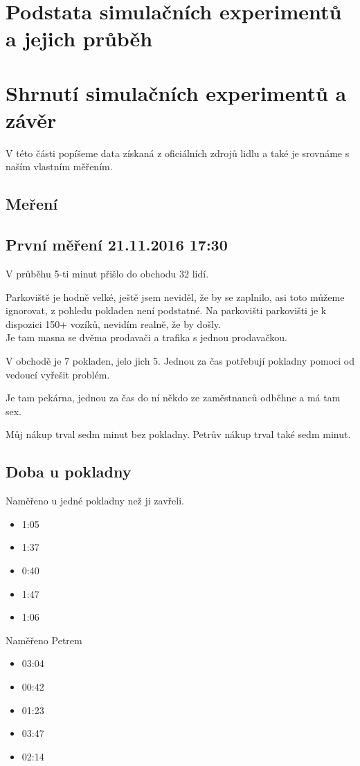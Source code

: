 \documentclass[12pt,a4paper,titlepage]{article}
\begin{document}
\section{Podstata simulačních experimentů a jejich průběh}
\section{Shrnutí simulačních experimentů a závěr}

V této části popíšeme data získaná z oficiálních zdrojů lidlu a také je srovnáme s naším vlastním měřením.
\subsection{Meření}
\subsection{První měření 21.11.2016 17:30}
V průběhu 5-ti minut přišlo do obchodu 32 lidí.

Parkoviště je hodně velké, ještě jsem neviděl, že by se zaplnilo, asi toto můžeme ignorovat, z pohledu pokladen není podstatné.
Na parkovišti parkovišti je k dispozici 150+ vozíků, nevidím realně, že by došly.
\\
Je tam masna se dvěma prodavači a trafika s jednou prodavačkou.

V obchodě je 7 pokladen, jelo jich 5. Jednou za čas potřebují pokladny pomoci od vedoucí vyřešit problém.

Je tam pekárna, jednou za čas do ní někdo ze zaměstnanců odběhne a má tam sex.

Můj nákup trval sedm minut bez pokladny. Petrův nákup trval také sedm minut.

\subsection{Doba u pokladny}
Naměřeno u jedné pokladny než ji zavřeli.
\begin{itemize}
\item 1:05
\item 1:37
\item 0:40
\item 1:47
\item 1:06
\end{itemize}
Naměřeno Petrem
\begin{itemize}
\item 03:04
\item 00:42
\item 01:23
\item 03:47
\item 02:14
\end{itemize}
\end{document}
